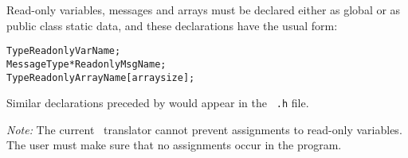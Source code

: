 Read-only variables, messages and arrays must be declared either as
global or as public class static data, and these declarations have the
usual form:

\begin{alltt}
 Type ReadonlyVarName;
 MessageType *ReadonlyMsgName;
 Type ReadonlyArrayName [arraysize];
\end{alltt}

Similar declarations preceded by  would appear in the {\tt
.h} file. 

{\it Note:}  The current \charmpp\ translator cannot prevent
assignments to read-only variables.  The user must make sure that no
assignments occur in the program.

